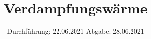 

\subject{V203}
\title{Verdampfungswärme}
\date{%
  Durchführung: 22.06.2021
  \hspace{3em}
  Abgabe: 28.06.2021
}



\maketitle
\thispagestyle{empty}
\tableofcontents
\newpage






\printbibliography{}

